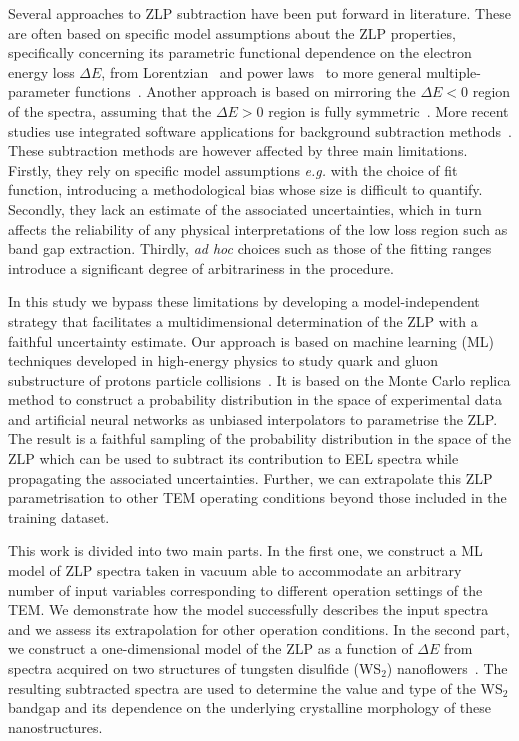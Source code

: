 Several approaches to ZLP subtraction\cite{Rafferty:2000, Stoger:2008, Egerton:1996} 
have been put forward in literature.
%
These are often based on specific model assumptions about the ZLP properties, specifically
concerning its parametric functional dependence on the electron energy loss $\Delta E$,
from Lorentzian~\cite{Dorneich:1998}
and power laws~\cite{Erni:2005} to more general multiple-parameter functions~\cite{Benthem:2001}.
%
Another approach is based on mirroring the $\Delta E <0$ region of the spectra, assuming
that the $\Delta E>0$ region is fully symmetric~\cite{Lazar:2003}.
%
More recent studies use integrated software applications for background subtraction 
methods~\cite{Egerton:10.1016/S0304-3991(01)00155-3, Held:2020, Granerod:2018, Fung:2020}.
%
These  subtraction methods are however affected by three main limitations.
%
Firstly, they rely on specific model assumptions {\it e.g.} with
the choice of fit function, introducing a methodological
bias whose size is difficult to quantify.
%
Secondly, they lack an estimate of the associated uncertainties, which in turn affects
the reliability of any physical interpretations of the low loss region such as
band gap extraction.
%
Thirdly, {\it ad hoc} choices such as those of the fitting ranges introduce a significant degree of
arbitrariness in the procedure.

In this study we bypass these limitations by developing a model-independent strategy
that facilitates a multidimensional determination of the ZLP
with a faithful uncertainty estimate.
%
Our approach is based on machine learning (ML) techniques
developed in high-energy physics to study
quark and gluon substructure of protons
particle collisions~\cite{Ball:2008by,Ball:2012cx,Ball:2014uwa,Ball:2017nwa}.
%
It is based on the Monte Carlo replica method to construct a probability
distribution in the space of experimental data and artificial
neural networks as unbiased interpolators to parametrise the ZLP.
%
The result is
a faithful sampling of the probability distribution in the space of the ZLP
which can be used to subtract its contribution to EEL spectra while
propagating the associated uncertainties.
%
Further, we can extrapolate this ZLP parametrisation to other TEM
operating conditions beyond those included in the training dataset.
%

This work is divided into two main parts.
%
In the first one, we construct a ML model of ZLP spectra taken
in vacuum able to accommodate an arbitrary number of input
variables corresponding to different operation settings of the TEM.
%
We demonstrate how the model successfully describes the
input spectra and we assess its extrapolation for other operation
conditions.
%
In the second part, we construct a one-dimensional model
of the ZLP as a function of $\Delta E$ from spectra acquired on two structures of
tungsten disulfide (WS$_2$) nanoflowers~\cite{SabryaWS2}.
%
The resulting subtracted spectra are used to determine
the value and type of the WS$_2$ bandgap
and its dependence on the underlying crystalline morphology of these nanostructures.

